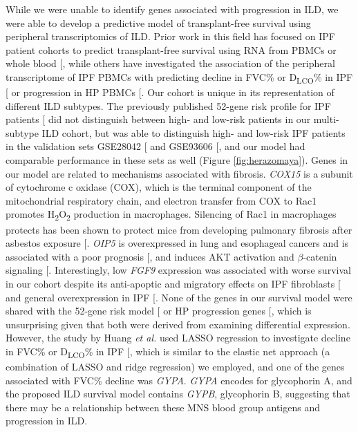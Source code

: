 \documentclass[
]{article}
\begin{document}
While we were unable to identify genes associated with progression in ILD, we were able to develop a predictive model of transplant-free survival using peripheral transcriptomics of ILD. Prior work in this field has focused on IPF patient cohorts to predict transplant-free survival using RNA from PBMCs or whole blood {[}\citeproc{ref-molyneaux_host-microbial_2017}{55}{]}, while others have investigated the association of the peripheral transcriptome of IPF PBMCs with predicting decline in FVC\% or D\textsubscript{LCO}\% in IPF {[}\citeproc{ref-huang_blood_2021}{101}{]} or progression in HP PBMCs {[}\citeproc{ref-fernandez_perez_prognostic_2022}{102}{]}. Our cohort is unique in its representation of different ILD subtypes. The previously published 52-gene risk profile for IPF patients {[}\citeproc{ref-herazo-maya_validating_2017}{100}{]} did not distinguish between high- and low-risk patients in our multi-subtype ILD cohort, but was able to distinguish high- and low-risk IPF patients in the validation sets GSE28042 {[}\citeproc{ref-herazo-maya_validating_2017}{100}{]} and GSE93606 {[}\citeproc{ref-molyneaux_host-microbial_2017}{55}{]}, and our model had comparable performance in these sets as well (Figure \ref{fig:herazomaya}). Genes in our model are related to mechanisms associated with fibrosis. \textit{COX15} is a subunit of cytochrome c oxidase (COX), which is the terminal component of the mitochondrial respiratory chain, and electron transfer from COX to Rac1 promotes H\textsubscript{2}O\textsubscript{2} production in macrophages. Silencing of Rac1 in macrophages protects has been shown to protect mice from developing pulmonary fibrosis after asbestos exposure {[}\citeproc{ref-osborn-heaford_mitochondrial_2012}{141}{]}. \textit{OIP5} is overexpressed in lung and esophageal cancers and is associated with a poor prognosis {[}\citeproc{ref-koinuma_characterization_2012}{142}{]}, and induces AKT activation and \(\beta\)-catenin signaling {[}\citeproc{ref-li_oip5_2017}{143}{]}. Interestingly, low \textit{FGF9} expression was associated with worse survival in our cohort despite its anti-apoptic and migratory effects on IPF fibroblasts {[}\citeproc{ref-joannes_fgf9_2016}{144}{]} and general overexpression in IPF {[}\citeproc{ref-coffey_expression_2013}{145}{]}. None of the genes in our survival model were shared with the 52-gene risk model {[}\citeproc{ref-herazo-maya_peripheral_2013}{59}{]} or HP progression genes {[}\citeproc{ref-fernandez_perez_prognostic_2022}{102}{]}, which is unsurprising given that both were derived from examining differential expression. However, the study by Huang \textit{et al.} used LASSO regression to investigate decline in FVC\% or D\textsubscript{LCO}\% in IPF {[}\citeproc{ref-huang_blood_2021}{101}{]}, which is similar to the elastic net approach (a combination of LASSO and ridge regression) we employed, and one of the genes associated with FVC\% decline was \textit{GYPA}. \textit{GYPA} encodes for glycophorin A, and the proposed ILD survival model contains \textit{GYPB}, glycophorin B, suggesting that there may be a relationship between these MNS blood group antigens and progression in ILD.
\end{document}
